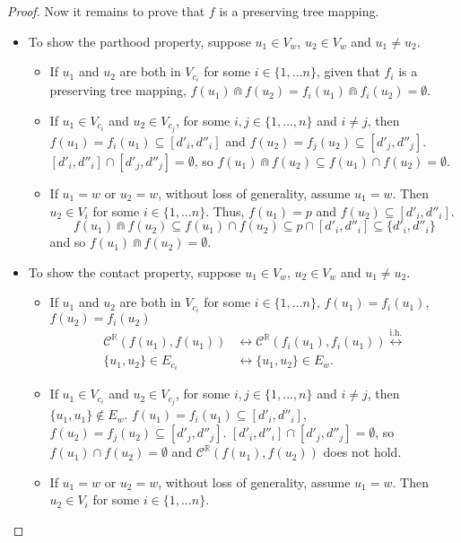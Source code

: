 \documentclass{article}
\newcommand{\R}{\mathbb{R}}
\newcommand{\bcap}{\Cap}
\newcommand{\bcont}{\mathcal{C}^\R}
\newcommand{\equivih}{\stackrel{\text{i.h.}}{\leftrightarrow}}
\begin{document}
\begin{proof}
  Now it remains to prove that $f$ is a preserving tree mapping.
  \begin{itemize}
  \item To show the parthood property, suppose $u_1 \in V_w$, $u_2 \in V_w$ and $u_1 \neq u_2$.
    \begin{itemize}
    \item If $u_1$ and $u_2$ are both in $V_{c_i}$ for some $i \in \{1, \dots n\}$, given that $f_i$ is a preserving tree mapping, $f(u_1) \bcap f(u_2) = f_i(u_1) \bcap f_i(u_2) = \emptyset$.
    \item If $u_1 \in V_{c_i}$ and $u_2 \in V_{c_j}$, for some $i, j \in \{1, \dots, n\}$ and $i \neq j$, then $f(u_1) = f_i(u_1) \subseteq [d'_i, d''_i]$ and $f(u_2) = f_j(u_2) \subseteq [d'_j, d''_j]$. $[d'_i, d''_i] \cap [d'_j, d''_j] = \emptyset$, so $f(u_1) \bcap f(u_2) \subseteq f(u_1) \cap f(u_2) = \emptyset$.
    \item If $u_1 = w$ or $u_2 = w$, without loss of generality, assume $u_1 = w$. Then $u_2 \in V_i$ for some $i \in \{1, \dots n\}$. Thus, $f(u_1) = p$ and $f(u_2) \subseteq [d'_i, d''_i]$.
      \begin{equation*}
        f(u_1) \bcap f(u_2) \subseteq f(u_1) \cap f(u_2) \subseteq p \cap [d'_i, d''_i] \subseteq \{d'_i, d''_i\}
      \end{equation*}
and so $f(u_1) \bcap f(u_2) = \emptyset$.
    \end{itemize}
  \item To show the contact property, suppose $u_1 \in V_w$, $u_2 \in V_w$ and $u_1 \neq u_2$.
    \begin{itemize}
    \item If $u_1$ and $u_2$ are both in $V_{c_i}$ for some $i \in \{1, \dots n\}$, $f(u_1) = f_i(u_1)$, $f(u_2) = f_i(u_2)$
      \begin{align*}
        \bcont(f(u_1), f(u_1)) &\leftrightarrow \bcont(f_i(u_1), f_i(u_1)) \equivih \\
        \{u_1, u_2\} \in E_{c_i} &\leftrightarrow \{u_1, u_2\} \in E_w.
      \end{align*}
    \item If $u_1 \in V_{c_i}$ and $u_2 \in V_{c_j}$, for some $i, j \in \{1, \dots, n\}$ and $i \neq j$, then $\{u_1, u_1\} \not \in E_w$. $f(u_1) = f_i(u_1) \subseteq [d'_i, d''_i]$, $f(u_2) = f_j(u_2) \subseteq [d'_j, d''_j]$. $[d'_i, d''_i] \cap [d'_j, d''_j] = \emptyset$, so $f(u_1) \cap f(u_2) = \emptyset$ and $\bcont(f(u_1), f(u_2))$ does not hold.
    \item If $u_1 = w$ or $u_2 = w$, without loss of generality, assume $u_1 = w$. Then $u_2 \in V_i$ for some $i \in \{1, \dots n\}$.

\end{itemize}
\end{itemize}
\end{proof}
\end{document}
